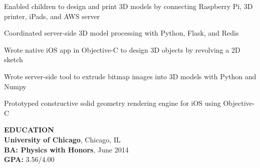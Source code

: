 \begin{tightlist}

\item Enabled children to design and print 3D models by connecting Raspberry Pi, 3D printer, iPads, and AWS server

\item Coordinated server-side 3D model processing with Python, Flask, and Redis

\item Wrote native iOS app in Objective-C to design 3D objects by revolving a 2D sketch

\item Wrote server-side tool to extrude bitmap images into 3D models with Python and Numpy

\item Prototyped constructive solid geometry rendering engine for iOS using Objective-C\\

\end{tightlist}

\noindent\textbf{EDUCATION} \\
\textbf{University of Chicago}, Chicago, IL \\
\textbf{BA: Physics with Honors}, June 2014 \\
\textbf{GPA:} 3.56/4.00 \\\\

